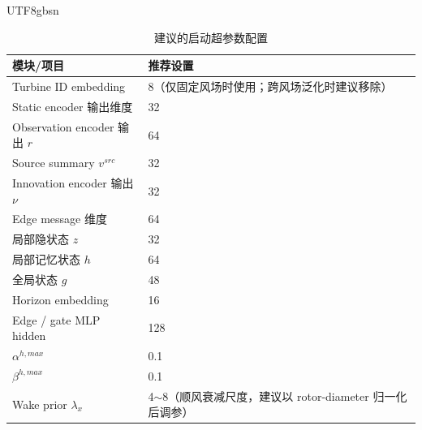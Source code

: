 \documentclass[11pt]{article}
\begin{document}
\begin{CJK}{UTF8}{gbsn}
\begin{table}[!ht]
\centering
\caption{建议的启动超参数配置}
\label{tab:hyperparams_startup}
\renewcommand{\arraystretch}{1.15}
\begin{tabularx}{0.96\linewidth}{@{}lX@{}}
\hline
\textbf{模块/项目}                     & \textbf{推荐设置}                                                                 \\
\hline
Turbine ID embedding                   & 8（仅固定风场时使用；跨风场泛化时建议移除）                                       \\
Static encoder 输出维度                & 32                                                                                \\
Observation encoder 输出 \(r\)         & 64                                                                                \\
Source summary \(v^{src}\)             & 32                                                                                \\
Innovation encoder 输出 \(\nu\)        & 32                                                                                \\
Edge message 维度                      & 64                                                                                \\
局部隐状态 \(z\)                       & 32                                                                                \\
局部记忆状态 \(h\)                     & 64                                                                                \\
全局状态 \(g\)                         & 48                                                                                \\
Horizon embedding                      & 16                                                                                \\
Edge / gate MLP hidden                 & 128                                                                                \\
$\alpha^{h,max}$                       & 0.1                                                                               \\
$\beta^{h,max}$                        & 0.1                                                                               \\
Wake prior \(\lambda_x\)              & 4\(\sim\)8（顺风衰减尺度，建议以 rotor-diameter 归一化后调参）                    \\

\end{tabularx}
\end{table}
\end{CJK}
\end{document}
